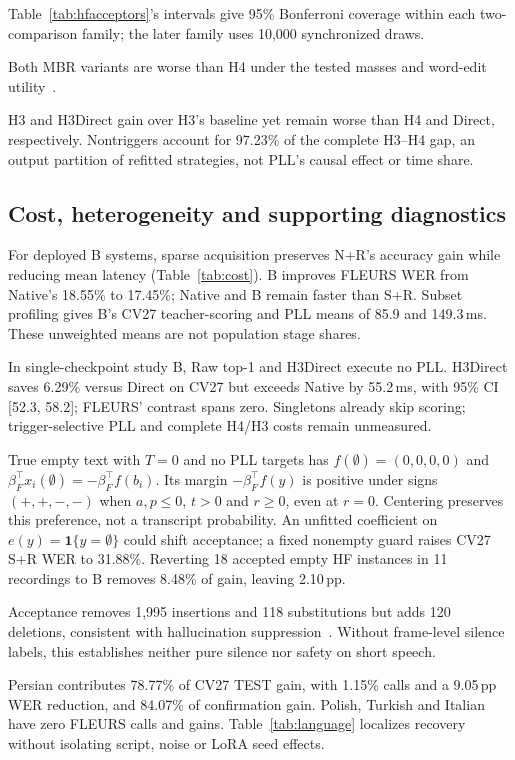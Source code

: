 Table~\ref{tab:hfacceptors}'s intervals give 95\% Bonferroni coverage within each two-comparison family; the later family uses 10,000 synchronized draws.

Both MBR variants are worse than H4 under the tested masses and word-edit utility~\cite{jinnai2025mbrasr}.

H3 and H3Direct gain over H3's baseline yet remain worse than H4 and Direct, respectively. Nontriggers account for 97.23\% of the complete H3--H4 gap, an output partition of refitted strategies, not PLL's causal effect or time share.

\subsection{Cost, heterogeneity and supporting diagnostics}

For deployed B systems, sparse acquisition preserves N+R's accuracy gain while reducing mean latency (Table~\ref{tab:cost}). B improves FLEURS WER from Native's 18.55\% to 17.45\%; Native and B remain faster than S+R. Subset profiling gives B's CV27 teacher-scoring and PLL means of 85.9 and 149.3\,ms. These unweighted means are not population stage shares.

In single-checkpoint study B, Raw top-1 and H3Direct execute no PLL. H3Direct saves 6.29\% versus Direct on CV27 but exceeds Native by 55.2\,ms, with 95\% CI [52.3, 58.2]; FLEURS' contrast spans zero. Singletons already skip scoring; trigger-selective PLL and complete H4/H3 costs remain unmeasured.


True empty text with $T=0$ and no PLL targets has $f(\emptyset)=(0,0,0,0)$ and $\beta_F^\top x_i(\emptyset)=-\beta_F^\top f(b_i)$. Its margin $-\beta_F^\top f(y)$ is positive under signs $(+,+,-,-)$ when $a,p\le0$, $t>0$ and $r\ge0$, even at $r=0$. Centering preserves this preference, not a transcript probability. An unfitted coefficient on $e(y)=\mathbf1\{y=\emptyset\}$ could shift acceptance; a fixed nonempty guard raises CV27 S+R WER to 31.88\%. Reverting 18 accepted empty HF instances in 11 recordings to B removes 8.48\% of gain, leaving 2.10\,pp.

Acceptance removes 1,995 insertions and 118 substitutions but adds 120 deletions, consistent with hallucination suppression~\cite{baranski2025nonspeech}. Without frame-level silence labels, this establishes neither pure silence nor safety on short speech.

\newpage
Persian contributes 78.77\% of CV27 TEST gain, with 1.15\% calls and a 9.05\,pp WER reduction, and 84.07\% of confirmation gain. Polish, Turkish and Italian have zero FLEURS calls and gains. Table~\ref{tab:language} localizes recovery without isolating script, noise or LoRA seed effects.

